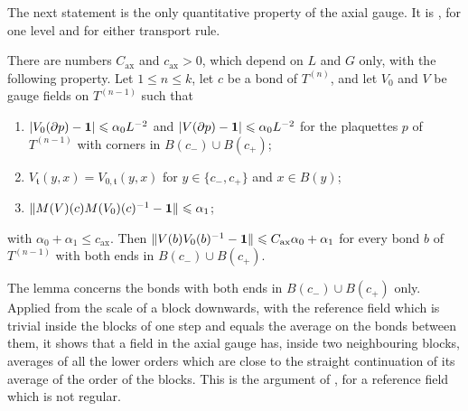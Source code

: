 \documentclass[11pt]{preprint}
\newcommand{\id}{\mathbf 1}
\DeclarePairedDelimiter{\abs}{\lvert}{\rvert}
\DeclarePairedDelimiter{\norm}{\lVert}{\rVert}
\numberwithin{equation}{section}
\begin{document}
The next statement is the only quantitative property of the axial gauge. It is \cite[Lemma~1, p.~79]{BalabanREG}, for one level and for either transport rule.

\begin{lemma}\label{lem:axial-smallness}
There are numbers $C_{\mathrm{ax}}$ and $c_{\mathrm{ax}} > 0$, which depend on $L$ and $G$ only, with the following property. Let $1 \leqslant n \leqslant k$, let $c$ be a bond of $T^{(n)}$, and let $V_0$ and $V$ be gauge fields on $T^{(n-1)}$ such that
\begin{enumerate}[label=(\roman*)]
\item $\abs{V_0(\partial p) - \id} \leqslant \alpha_0L^{-2}$ and $\abs{V(\partial p) - \id} \leqslant \alpha_0L^{-2}$ for the plaquettes $p$ of $T^{(n-1)}$ with corners in $B(c_-) \cup B(c_+)$;
\item $V_{\mathfrak t}(y, x) = V_{0,\mathfrak t}(y, x)$ for $y \in \{ c_-, c_+ \}$ and $x \in B(y)$;
\item $\norm{M(V)(c)M(V_0)(c)^{-1} - \id} \leqslant \alpha_1$;
\end{enumerate}
with $\alpha_0 + \alpha_1 \leqslant c_{\mathrm{ax}}$. Then $\norm{V(b)V_0(b)^{-1} - \id} \leqslant C_{\mathrm{ax}}\alpha_0 + \alpha_1$ for every bond $b$ of $T^{(n-1)}$ with both ends in $B(c_-) \cup B(c_+)$.
\end{lemma}

The lemma concerns the bonds with both ends in $B(c_-) \cup B(c_+)$ only. Applied from the scale of a block downwards, with the reference field which is trivial inside the blocks of one step and equals the average on the bonds between them, it shows that a field in the axial gauge has, inside two neighbouring blocks, averages of all the lower orders which are close to the straight continuation of its average of the order of the blocks. This is the argument of \cite[p.~87]{BalabanREG}, for a reference field which is not regular.
\end{document}
